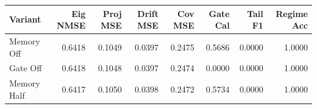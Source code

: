 \begin{tabular}{lrrrrrrr}
\toprule
Variant & Eig NMSE & Proj MSE & Drift MSE & Cov MSE & Gate Cal & Tail F1 & Regime Acc \\
\midrule
Memory Off & 0.6418 & 0.1049 & 0.0397 & 0.2475 & 0.5686 & 0.0000 & 1.0000 \\
Gate Off & 0.6418 & 0.1048 & 0.0397 & 0.2474 & 0.0000 & 0.0000 & 1.0000 \\
Memory Half & 0.6417 & 0.1050 & 0.0398 & 0.2472 & 0.5734 & 0.0000 & 1.0000 \\
\bottomrule
\end{tabular}